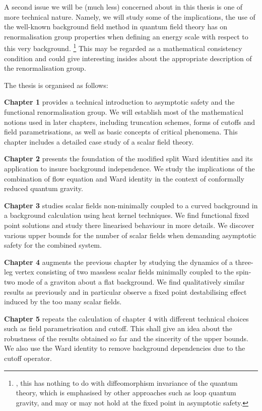 \documentclass[11pt]{book} %
\numberwithin{equation}{chapter}
\begin{document}
A second issue we will be (much less) concerned about in this thesis is one of
more technical nature. Namely, we will study some of the implications, the use
of the well-known background field method in quantum field theory has on renormalisation
group properties when defining an energy scale with respect to this very background.%
\footnote{%
  , this has nothing to do with diffeomorphism invariance of
  the quantum theory, which is emphasised by other approaches such as loop quantum gravity,
  and may or may not hold at the fixed point in asymptotic safety.
}
This may be regarded as a mathematical consistency condition and could give
interesting insides about the appropriate description of the renormalisation group.

\bigskip
\noindent
The thesis is organised as follows:

\medskip
\textbf{Chapter 1} provides a technical introduction to asymptotic safety and the
functional renormalisation group. We will establish most of the mathematical notions
used in later chapters, including truncation schemes, forms of cutoffs and field
parametrisations, as well as basic concepts of critical phenomena. This chapter includes
a detailed case study of a scalar field theory.

\medskip
\textbf{Chapter 2} presents the foundation of the modified split Ward identities and
its application to insure background independence. We study the implications of the
combination of flow equation and Ward identity in the context of conformally reduced
quantum gravity.

\medskip
\textbf{Chapter 3} studies scalar fields non-minimally coupled to a curved background
in a background calculation using heat kernel techniques. We find functional fixed point
solutions and study there linearised behaviour in more details. We discover various
upper bounds for the number of scalar fields when demanding asymptotic safety for
the combined system.

\medskip
\textbf{Chapter 4} augments the previous chapter by studying the dynamics
of a three-leg vertex consisting of two massless scalar fields minimally coupled to
the spin-two mode of a graviton about a flat background.
We find qualitatively similar results as previously and in particular observe
a fixed point destabilising effect induced by the too many scalar fields.

\medskip
\textbf{Chapter 5} repeats the calculation of chapter 4 with different technical choices
such as field parametrisation and cutoff. This shall give an idea about the
robustness of the results obtained so far and the sincerity of the upper bounds.
We also use the Ward identity to remove background dependencies due to the
cutoff operator.
\end{document}
